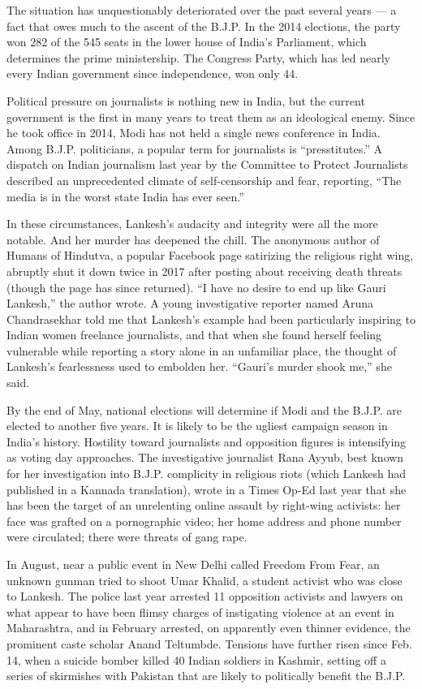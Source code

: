 The situation has unquestionably deteriorated over the past several
years --- a fact that owes much to the ascent of the B.J.P. In the 2014
elections, the party won 282 of the 545 seats in the lower house of
India's Parliament, which determines the prime ministership. The
Congress Party, which has led nearly every Indian government since
independence, won only 44.

Political pressure on journalists is nothing new in India, but the
current government is the first in many years to treat them as an
ideological enemy. Since he took office in 2014, Modi has not held a
single news conference in India. Among B.J.P. politicians, a popular
term for journalists is ``presstitutes.'' A dispatch on Indian
journalism last year by the Committee to Protect Journalists described
an unprecedented climate of self-censorship and fear, reporting, ``The
media is in the worst state India has ever seen.''

In these circumstances, Lankesh's audacity and integrity were all the
more notable. And her murder has deepened the chill. The anonymous
author of Humans of Hindutva, a popular Facebook page satirizing the
religious right wing, abruptly shut it down twice in 2017 after posting
about receiving death threats (though the page has since returned). ``I
have no desire to end up like Gauri Lankesh,'' the author wrote. A young
investigative reporter named Aruna Chandrasekhar told me that Lankesh's
example had been particularly inspiring to Indian women freelance
journalists, and that when she found herself feeling vulnerable while
reporting a story alone in an unfamiliar place, the thought of Lankesh's
fearlessness used to embolden her. ``Gauri's murder shook me,'' she
said.

By the end of May, national elections will determine if Modi and the
B.J.P. are elected to another five years. It is likely to be the ugliest
campaign season in India's history. Hostility toward journalists and
opposition figures is intensifying as voting day approaches. The
investigative journalist Rana Ayyub, best known for her investigation
into B.J.P. complicity in religious riots (which Lankesh had published
in a Kannada translation), wrote in a Times Op-Ed last year that she has
been the target of an unrelenting online assault by right-wing
activists: her face was grafted on a pornographic video; her home
address and phone number were circulated; there were threats of gang
rape.

In August, near a public event in New Delhi called Freedom From Fear, an
unknown gunman tried to shoot Umar Khalid, a student activist who was
close to Lankesh. The police last year arrested 11 opposition activists
and lawyers on what appear to have been flimsy charges of instigating
violence at an event in Maharashtra, and in February arrested, on
apparently even thinner evidence, the prominent caste scholar Anand
Teltumbde. Tensions have further risen since Feb. 14, when a suicide
bomber killed 40 Indian soldiers in Kashmir, setting off a series of
skirmishes with Pakistan that are likely to politically benefit the
B.J.P.

